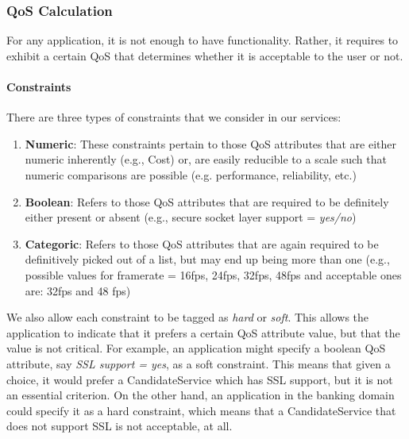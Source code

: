 \documentclass[10pt,journal,compsoc]{IEEEtran}
\begin{document}
\subsubsection{QoS Calculation}
For any application, it is not enough to have functionality. Rather, it requires to exhibit a certain QoS that determines whether it is acceptable to the user or not. 
\paragraph{Constraints} There are three types of constraints that we consider in our services:
	\begin{enumerate}
	    \item \textbf{Numeric}: These constraints pertain to those QoS attributes that are either numeric inherently (e.g., Cost) or, are easily reducible to a scale such that numeric comparisons are possible (e.g. performance, reliability, etc.)
	    \item \textbf{Boolean}: Refers to those QoS attributes that are required to be definitely either present or absent (e.g., secure socket layer support = \textit{yes/no})
	    \item \textbf{Categoric}: Refers to those QoS attributes that are again required to be definitively picked out of a list, but may end up being more than one (e.g., possible values for framerate = 16fps, 24fps, 32fps, 48fps and acceptable ones are: 32fps and 48 fps) 
	\end{enumerate}
We also allow each constraint to be tagged as \textit{hard} or \textit{soft}. This allows the application to indicate that it prefers a certain QoS attribute value, but that the value is not critical. For example, an application might specify a boolean QoS attribute, say \textit{SSL support = yes}, as a soft constraint. This means that given a choice, it would prefer a CandidateService which has SSL support, but it is not an essential criterion. On the other hand, an application in the banking domain could specify it as a hard constraint, which means that a CandidateService that does not support SSL is not acceptable, at all.
\end{document}
